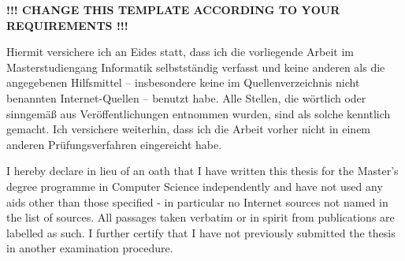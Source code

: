 %
\color{red}
\begin{center}
\bf !!! CHANGE THIS TEMPLATE ACCORDING TO YOUR REQUIREMENTS !!!
\end{center}
%
\par\noindent Hiermit versichere ich an Eides statt, dass ich die vorliegende Arbeit im Masterstudiengang Informatik selbstständig verfasst und keine anderen als die angegebenen Hilfsmittel – insbesondere keine im Quellenverzeichnis nicht benannten Internet-Quellen – benutzt habe.
Alle Stellen, die wörtlich oder sinngemäß aus Veröffentlichungen entnommen wurden, sind als solche kenntlich gemacht.
Ich versichere weiterhin, dass ich die Arbeit vorher nicht in einem anderen Prüfungsverfahren eingereicht habe.
%
\vspace*{2em}%
%
\par\noindent I hereby declare in lieu of an oath that I have written this thesis for the Master's degree programme in Computer Science independently and have not used any aids other than those specified - in particular no Internet sources not named in the list of sources.
All passages taken verbatim or in spirit from publications are labelled as such.
I further certify that I have not previously submitted the thesis in another examination procedure.

